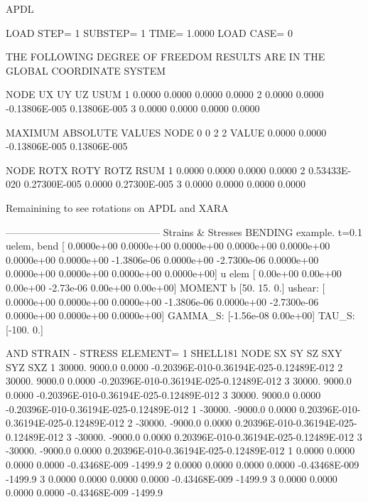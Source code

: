 APDL

  LOAD STEP=     1  SUBSTEP=     1                                             
   TIME=    1.0000      LOAD CASE=   0                                         
 
  THE FOLLOWING DEGREE OF FREEDOM RESULTS ARE IN THE GLOBAL COORDINATE SYSTEM  
 
    NODE       UX           UY           UZ           USUM  
       1   0.0000       0.0000       0.0000       0.0000     
       2   0.0000       0.0000     -0.13806E-005 0.13806E-005
       3   0.0000       0.0000       0.0000       0.0000     

 MAXIMUM ABSOLUTE VALUES
 NODE          0            0            2            2
 VALUE    0.0000       0.0000     -0.13806E-005 0.13806E-005


 
    NODE       ROTX         ROTY         ROTZ         RSUM  
       1   0.0000       0.0000       0.0000       0.0000     
       2  0.53433E-020 0.27300E-005  0.0000      0.27300E-005
       3   0.0000       0.0000       0.0000       0.0000   


Remainining to see rotations on APDL and XARA 


-----------------------------------------------
Strains & Stresses
BENDING example. t=0.1
uelem, bend [ 0.0000e+00  0.0000e+00  0.0000e+00  0.0000e+00  0.0000e+00  0.0000e+00
  0.0000e+00 -1.3806e-06  0.0000e+00 -2.7300e-06  0.0000e+00  0.0000e+00
  0.0000e+00  0.0000e+00  0.0000e+00]
u elem [ 0.00e+00  0.00e+00  0.00e+00 -2.73e-06  0.00e+00  0.00e+00]
MOMENT b [50. 15.  0.]
ushear: [ 0.0000e+00  0.0000e+00  0.0000e+00 -1.3806e-06  0.0000e+00 -2.7300e-06
  0.0000e+00  0.0000e+00  0.0000e+00]
GAMMA_S:  [-1.56e-08  0.00e+00] TAU_S:  [-100.    0.]



AND STRAIN - STRESS
  ELEMENT=       1        SHELL181
    NODE     SX           SY           SZ           SXY          SYZ          SXZ     
       1   30000.       9000.0       0.0000     -0.20396E-010-0.36194E-025-0.12489E-012
       2   30000.       9000.0       0.0000     -0.20396E-010-0.36194E-025-0.12489E-012
       3   30000.       9000.0       0.0000     -0.20396E-010-0.36194E-025-0.12489E-012
       3   30000.       9000.0       0.0000     -0.20396E-010-0.36194E-025-0.12489E-012
       1  -30000.      -9000.0       0.0000      0.20396E-010-0.36194E-025-0.12489E-012
       2  -30000.      -9000.0       0.0000      0.20396E-010-0.36194E-025-0.12489E-012
       3  -30000.      -9000.0       0.0000      0.20396E-010-0.36194E-025-0.12489E-012
       3  -30000.      -9000.0       0.0000      0.20396E-010-0.36194E-025-0.12489E-012
       1   0.0000       0.0000       0.0000       0.0000     -0.43468E-009 -1499.9     
       2   0.0000       0.0000       0.0000       0.0000     -0.43468E-009 -1499.9     
       3   0.0000       0.0000       0.0000       0.0000     -0.43468E-009 -1499.9     
       3   0.0000       0.0000       0.0000       0.0000     -0.43468E-009 -1499.9     


